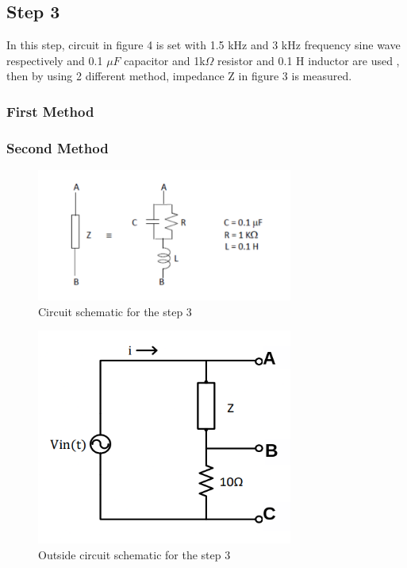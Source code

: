 \documentclass[letterpaper,12pt]{article}
\begin{document}
\subsection{Step 3}

In this step, circuit in figure 4 is set with 1.5 kHz and 3 kHz frequency sine wave respectively and 0.1 \(\mu F\) capacitor and 1k\(\Omega \) resistor and 0.1 H inductor are used , then by using 2 different method, impedance Z in figure 3 is measured. 

\subsubsection{First Method}


\subsubsection{Second Method}

\begin{figure}[H]
    \centering
    \includegraphics[width = 0.75\textwidth]{3SCH.png}
    \caption{Circuit schematic for the step 3}
\end{figure} 

\begin{figure}[H]
    \centering
    \includegraphics[width = 0.75\textwidth]{3_1SCH.png}
    \caption{Outside circuit schematic for the step 3}
\end{figure} 
\end{document}
